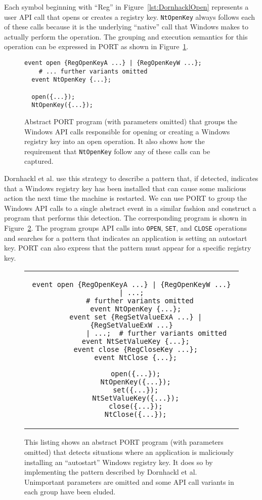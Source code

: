 Each symbol beginning with ``Reg'' in Figure~\ref{lst:DornhacklOpen} represents a user
API call that opens or creates a registry key.  {\tt NtOpenKey} always follows
each of these calls because it is the underlying ``native'' call that
Windows makes to actually perform the operation.
The grouping and execution semantics for this operation can be expressed
in PORT as shown in Figure~\ref{lst:PORTOpenReg}.

\begin{figure}
\begin{lstlisting}[gobble=2]
  event open {RegOpenKeyA ...} | {RegOpenKeyW ...};
    # ... further variants omitted
  event NtOpenKey {...};

  open({...});
  NtOpenKey({...});
\end{lstlisting}
  \caption{Abstract PORT program (with parameters
  omitted) that groups the Windows API calls responsible for opening or
  creating a Windows registry key into an open operation.  It also shows
  how the requirement that \lstinline+NtOpenKey+ follow any of these calls can be
  captured.}
\label{lst:PORTOpenReg}
\end{figure}

Dornhackl et al. use this strategy to describe a pattern that, if
detected, indicates that
a Windows registry key has been installed
that can cause some malicious action
the next time the machine is restarted.  We can use PORT to group the
Windows API calls to a single abstract event in a similar fashion and
construct a program that performs this detection.
The corresponding program is shown in Figure~\ref{lst:PORTRegDetect}.  The program groups API calls into \lstinline+OPEN+, \lstinline+SET+, and \lstinline+CLOSE+ operations and searches for a pattern that
indicates
an application is
setting an autostart key.  PORT can also express
that the pattern must appear for a specific registry key.

\begin{figure}
\centering
\begin{tabular}{c}
\begin{lstlisting}[gobble=2]
  event open {RegOpenKeyA ...} | {RegOpenKeyW ...} | ...;
    # further variants omitted
  event NtOpenKey {...};
  event set {RegSetValueExA ...} | {RegSetValueExW ...}
            | ...;  # further variants omitted
  event NtSetValueKey {...};
  event close {RegCloseKey ...};
  event NtClose {...};

  open({...});
  NtOpenKey({...});
  set({...});
  NtSetValueKey({...});
  close({...});
  NtClose({...});
\end{lstlisting}
\end{tabular}
  \caption{This listing shows an abstract PORT program (with parameters
  omitted) that detects situations where an application is maliciously
  installing an ``autostart'' Windows registry key.  It does so by
  implementing the pattern described by Dornhackl et al.  Unimportant
  parameters are omitted and some API call variants in each group have been
  eluded.}
\label{lst:PORTRegDetect}
\end{figure}


